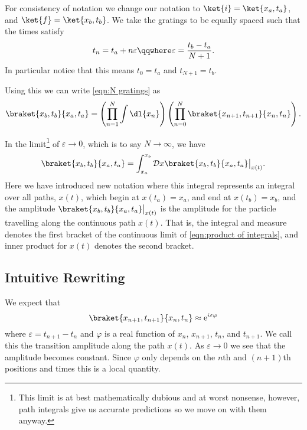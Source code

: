 \documentclass[fleqn]{NotesClass}
\newcommand*{\e}{\mathrm{e}}
\begin{document}
    For consistency of notation we change our notation to \(\ket{i} = \ket{x_a, t_a}\), and \(\ket{f} = \ket{x_b, t_b}\).
    We take the gratings to be equally spaced such that the times satisfy
    \begin{equation}
        t_n = t_a + n\varepsilon \qqwhere \varepsilon = \frac{t_b - t_a}{N + 1}.
    \end{equation}
    In particular notice that this means \(t_0 = t_a\) and \(t_{N+1} = t_b\).
    
    Using this we can write \cref{eqn:N gratings} as
    \begin{equation}\label{eqn:product of integrals}
        \braket{x_b, t_b}{x_a, t_a} = \left( \prod_{n=1}^{N} \int \dl{x_n} \right) \left( \prod_{n=0}^{N} \braket{x_{n+1}, t_{n+1}}{x_n, t_n} \right).
    \end{equation}
    
    In the limit\footnote{This limit is at best mathematically dubious and at worst nonsense, however, path integrals give us accurate predictions so we move on with them anyway.} of \(\varepsilon \to 0\), which is to say \(N \to \infty\), we have
    \begin{equation}
        \braket{x_b, t_b}{x_a, t_a} = \int_{x_a}^{x_b} \DL{x} \braket{x_b, t_b}{x_a, t_a}\big\vert_{x(t)}.
    \end{equation}
    Here we have introduced new notation where this integral represents an integral over all paths, \(x(t)\), which begin at \(x(t_a) = x_a\), and end at \(x(t_b) = x_b\), and the amplitude \(\braket{x_b, t_b}{x_a, t_a}\big\vert_{x(t)}\) is the amplitude for the particle travelling along the continuous path \(x(t)\).
    That is, the integral and measure denotes the first bracket of the continuous limit of \cref{eqn:product of integrals}, and inner product for \(x(t)\) denotes the second bracket.
    
    \subsection{Intuitive Rewriting}\label{sec:intuitive rewriting}
    We expect that
    \begin{equation}
        \braket{x_{n+1}, t_{n+1}}{x_n, t_n} \approx \e^{i\varepsilon\varphi}
    \end{equation}
    where \(\varepsilon = t_{n+1} - t_n\) and \(\varphi\) is a real function of \(x_n\), \(x_{n+1}\), \(t_n\), and \(t_{n+1}\).
    We call this the transition amplitude along the path \(x(t)\).
    As \(\varepsilon \to 0\) we see that the amplitude becomes constant.
    Since \(\varphi\) only depends on the \(n\)th and \((n + 1)\)th positions and times this is a local quantity.
    
\end{document}
